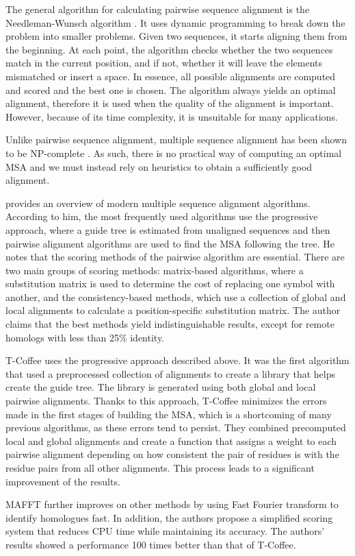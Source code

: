 The general algorithm for calculating pairwise sequence alignment is the Needleman-Wunsch algorithm \citep{needleman}. It uses dynamic programming
to break down the problem into smaller problems. Given two sequences, it starts aligning them from the beginning. At each point, the algorithm checks
whether the two sequences match in the current position, and if not, whether it will leave the elements mismatched or insert a space. In essence,
all possible alignments are computed and scored and the best one is chosen. The algorithm always yields an optimal alignment, therefore it is
used when the quality of the alignment is important. However, because of its time complexity, it is unsuitable for many applications.

Unlike pairwise sequence alignment, multiple sequence alignment has been shown to be NP-complete \citep{msa_complexity}. As such, there is no practical
way of computing an optimal MSA and we must instead rely on heuristics to obtain a sufficiently good alignment.

\cite{msa_overview} provides an overview of modern multiple sequence alignment algorithms. According to him, the most frequently used algorithms use
the progressive approach, where a guide tree is estimated from unaligned sequences and then pairwise alignment algorithms are used to find
the MSA following the tree. He notes that the scoring methods of the pairwise algorithm are essential. There are two main groups of scoring methods:
matrix-based algorithms, where a substitution matrix is used to determine the cost of replacing one symbol with another, and the consistency-based
methods, which use a collection of global and local alignments to calculate a position-specific substitution matrix. The author claims that
the best methods yield indistinguishable results, except for remote homologs with less than 25\% identity.

T-Coffee \citep{t_coffee} uses the progressive approach described above. It was the first algorithm that used a preprocessed collection of 
alignments to create a library that helps create the guide tree. The library is generated using both global and local pairwise alignments.
Thanks to this approach, T-Coffee minimizes the errors made in the first stages of building the MSA, which is a shortcoming of many previous
algorithms, as these errors tend to persist. They combined precomputed local and global alignments and create a function that assigns a weight to
each pairwise alignment depending on how consistent the pair of residues is with the residue pairs from all other alignments. This process
leads to a significant improvement of the results.

MAFFT \citep{mafft} further improves on other methods by using Fast Fourier transform to identify homologues fast. In addition, the authors
propose a simplified scoring system that reduces CPU time while maintaining its accuracy. The authors' results showed a performance 
100 times better than that of T-Coffee. 
